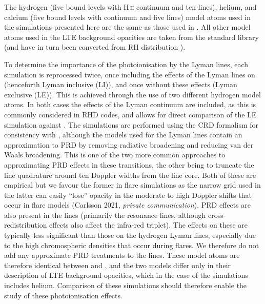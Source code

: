 The hydrogen (five bound levels with H\,\textsc{ii} continuum and ten lines), helium, and calcium (five bound \Caii{} levels with \Caiii{} continuum and five lines) model atoms used in the simulations presented here are the same as those used in \Radyn{}.
All other model atoms used in the LTE background opacities are taken from the \Lw{} standard library (and have in turn been converted from  RH distribution \citep{Uitenbroek2001}).

To determine the importance of the photoionisation by the Lyman lines, each \Radyn{} simulation is reprocessed twice, once including the effects of the Lyman lines on \Caii{} (henceforth Lyman inclusive (LI)), and once without these effects (Lyman exclusive (LE)).
This is achieved through the use of two different hydrogen model atoms.
In both cases the effects of the Lyman continuum are included, as this is commonly considered in RHD codes, and allows for direct comparison of the LE simulation against \Radyn{}.
The simulations are performed using the CRD formalism for consistency with \Radyn{}, although the models used for the Lyman lines contain an approximation to PRD by removing radiative broadening and reducing van der Waals broadening.
This is one of the two more common approaches to approximating PRD effects in these transitions, the other being to truncate the line quadrature around ten Doppler widths from the line core.
Both of these are empirical but we favour the former in flare simulations as the narrow grid used in the latter can easily ``lose'' opacity in the moderate to high Doppler shifts that occur in flare models (Carlsson 2021, \emph{private communication}).
PRD effects are also present in the \Caii{} lines (primarily the resonance lines, although cross-redistribution effects also affect the infra-red triplet).
The effects on these are typically less significant than those on the hydrogen Lyman lines, especially due to the high chromospheric densities that occur during flares.
We therefore do not add any approximate PRD treatments to the \Caii{} lines.
These model atoms are therefore identical between \Radyn{} and \Lw{}, and the two models differ only in their description of LTE background opacities, which in the case of the \Lw{} simulations includes helium.
Comparison of these simulations should therefore enable the study of these photoionisation effects.

